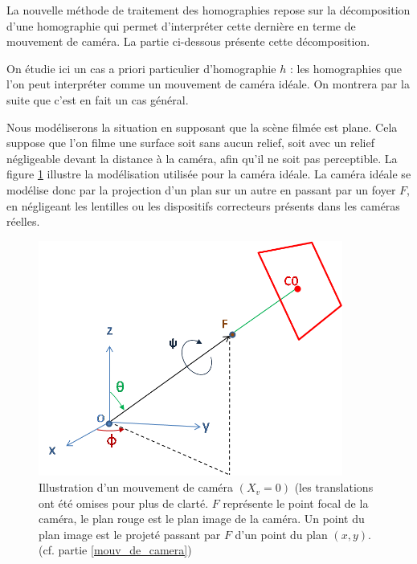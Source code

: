 La nouvelle méthode de traitement des homographies repose sur la décomposition d'une homographie qui permet d'interpréter cette dernière en terme de mouvement de caméra. La partie ci-dessous présente cette décomposition.

\label{mouv_de_camera}
On étudie ici un cas a priori particulier d'homographie $h$ : les homographies que l'on peut interpréter comme un mouvement de caméra idéale. On montrera par la suite que c'est en fait un cas général.

Nous modéliserons la situation en supposant que la scène filmée est plane. Cela suppose que l'on filme une surface soit sans aucun relief, soit avec un relief négligeable devant la distance à la caméra, afin qu'il ne soit pas perceptible. La figure \ref{shmdecomp} illustre la modélisation utilisée pour la caméra idéale. La caméra idéale se modélise donc par la projection d'un plan sur un autre en passant par un foyer $F$, en négligeant les lentilles ou les dispositifs correcteurs présents dans les caméras réelles.

\begin{figure}[h!]

\centering
\includegraphics[width=10cm]{shema_decomp.png}
\caption{Illustration d'un mouvement de caméra $(X_v =0)$ (les translations ont été omises pour plus de clarté. $F$ représente le point focal de la caméra, le plan rouge est le plan image de la caméra. Un point du plan image est le projeté passant par $F$ d'un point du plan $(x,y)$. (cf. partie \ref{mouv_de_camera})}
\label{shmdecomp}
\end{figure}



